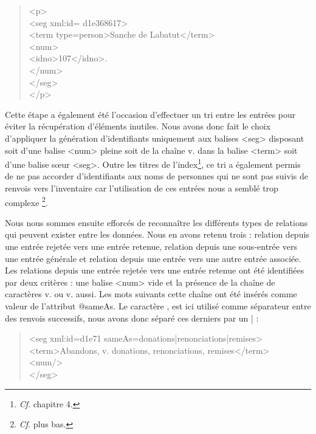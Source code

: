 \documentclass[a4paper,12pt,twoside]{book}
\begin{document}
	\begin{quotation}
		<p>\\
		\indent\indent<seg xml:id=\textquotesingle{} d1e368617\textquotesingle >\\
		\indent\indent\indent<term type=\textquotesingle person\textquotesingle >Sanche de Labatut</term>\\
		\indent\indent\indent<num>\\
		\indent\indent\indent{}107</idno>.\\
		\indent\indent{}\\
		\indent{}\\
		\indent</p>
	\end{quotation}
	
	\noindent Cette étape a également été l'occasion d'effectuer un tri entre les entrées pour éviter la récupération d'éléments inutiles. Nous avons donc fait le choix d'appliquer la génération d'identifiants uniquement aux balises <seg> disposant soit d'une balise <num> pleine soit de la chaîne \og v.\fg{} dans la balise <term> soit d'une balise sœur <seg>. Outre les titres de l'index\footnote{\textit{Cf}. chapitre 4.}, ce tri a également permis de ne pas accorder d'identifiants aux noms de personnes qui ne sont pas suivis de renvois vers l'inventaire car l'utilisation de ces entrées nous a semblé trop complexe \footnote{\textit{Cf}. plus bas.}.
	
	Nous nous sommes ensuite efforcés de reconnaître les différents types de relations qui peuvent exister entre les données. Nous en avons retenu trois : relation depuis une entrée rejetée vers une entrée retenue, relation depuis une sous-entrée vers une entrée générale et relation depuis une entrée vers une autre entrée associée. Les relations depuis une entrée rejetée vers une entrée retenue ont été identifiées par deux critères : une balise <num> vide et la présence de la chaîne de caractères \og v.\fg{} ou \og v. aussi\fg{}. Les mots suivants cette chaîne ont été insérés comme valeur de l'attribut @sameAs. Le caractère \og ,\fg{} est ici utilisé comme séparateur entre des renvois successifs, nous avons donc séparé ces derniers par un \og |\fg{} :
	
	\begin{quotation}
               <seg xml:id=\textquotesingle d1e71\textquotesingle{}  sameAs=\textquotesingle donations|renonciations|remises\textquotesingle >\\
				\indent\indent<term>Abandons, v. donations, renonciations, remises</term>\\
				\indent\indent<num/>\\
				\indent</seg>
	\end{quotation}
\end{document}
